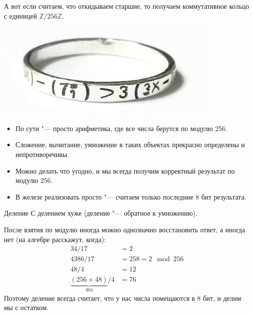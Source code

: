 \begin{frame}
	А вот если считаем, что откидываем старшие, то получаем коммутативное кольцо с единицей $\mathbb{Z}/256\mathbb{Z}$.

	\begin{center}
		\includegraphics[scale=0.5]{math-ring.jpg}
	\end{center}

	\begin{itemize}
		\item
			По сути "--- просто арифметика, где все числа берутся по модулю 256.
		\item
			Сложение, вычитание, умножение в таких объектах прекрасно определены и непротиворечивы.
		\item
			Можно делать что угодно, и мы всегда получим корректный результат по модулю 256.
		\item
			В железе реализовать просто "--- считаем только последние 8 бит результата.
	\end{itemize}
\end{frame}

\begin{frame}{Деление}
	С делением хуже (деление "--- обратное к умножению).

	После взятия по модулю иногда можно однозначно восстановить ответ, а иногда нет (на алгебре расскажут, когда):
	\begin{align*}
	    34 / 17 &= 2 \\
		4386 / 17 &= 258 = 2 \mod 256 \\
		48 / 4 &= 12 \\
		\underbrace{(256+48)}_{304} / 4 &= 76
	\end{align*}
	Поэтому деление всегда считает, что у нас числа помещаются в 8 бит, и делим мы с остатком.
\end{frame}
